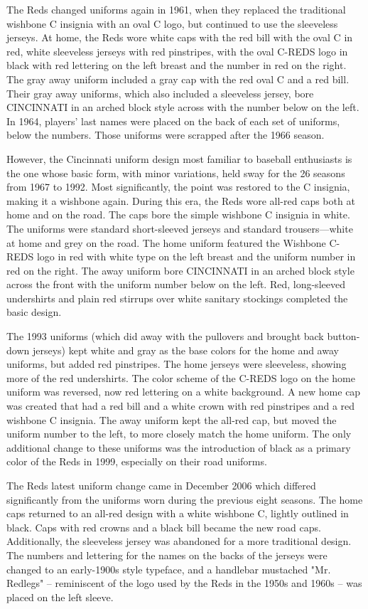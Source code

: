 The Reds changed uniforms again in 1961, when they replaced the
traditional wishbone C insignia with an oval C logo, but continued to
use the sleeveless jerseys. At home, the Reds wore white caps with the
red bill with the oval C in red, white sleeveless jerseys with red
pinstripes, with the oval C-REDS logo in black with red lettering on the
left breast and the number in red on the right. The gray away uniform
included a gray cap with the red oval C and a red bill. Their gray away
uniforms, which also included a sleeveless jersey, bore CINCINNATI in an
arched block style across with the number below on the left. In 1964,
players' last names were placed on the back of each set of uniforms,
below the numbers. Those uniforms were scrapped after the 1966 season.

However, the Cincinnati uniform design most familiar to baseball
enthusiasts is the one whose basic form, with minor variations, held
sway for the 26 seasons from 1967 to 1992. Most significantly, the point
was restored to the C insignia, making it a wishbone again. During this
era, the Reds wore all-red caps both at home and on the road. The caps
bore the simple wishbone C insignia in white. The uniforms were standard
short-sleeved jerseys and standard trousers---white at home and grey on
the road. The home uniform featured the Wishbone C-REDS logo in red with
white type on the left breast and the uniform number in red on the
right. The away uniform bore CINCINNATI in an arched block style across
the front with the uniform number below on the left. Red, long-sleeved
undershirts and plain red stirrups over white sanitary stockings
completed the basic design.

The 1993 uniforms (which did away with the pullovers and brought back
button-down jerseys) kept white and gray as the base colors for the home
and away uniforms, but added red pinstripes. The home jerseys were
sleeveless, showing more of the red undershirts. The color scheme of the
C-REDS logo on the home uniform was reversed, now red lettering on a
white background. A new home cap was created that had a red bill and a
white crown with red pinstripes and a red wishbone C insignia. The away
uniform kept the all-red cap, but moved the uniform number to the left,
to more closely match the home uniform. The only additional change to
these uniforms was the introduction of black as a primary color of the
Reds in 1999, especially on their road uniforms.

The Reds latest uniform change came in December 2006 which differed
significantly from the uniforms worn during the previous eight seasons.
The home caps returned to an all-red design with a white wishbone C,
lightly outlined in black. Caps with red crowns and a black bill became
the new road caps. Additionally, the sleeveless jersey was abandoned for
a more traditional design. The numbers and lettering for the names on
the backs of the jerseys were changed to an early-1900s style typeface,
and a handlebar mustached "Mr. Redlegs" -- reminiscent of the logo used
by the Reds in the 1950s and 1960s -- was placed on the left sleeve.

